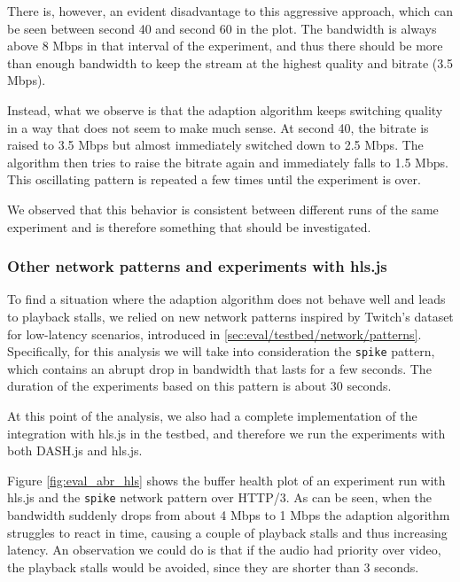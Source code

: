 There is, however, an evident disadvantage to this aggressive approach, which can be seen between second 40 and second 60 in the plot. The bandwidth is always above 8 Mbps in that interval of the experiment, and thus there should be more than enough bandwidth to keep the stream at the highest quality and bitrate (3.5 Mbps).

Instead, what we observe is that the adaption algorithm keeps switching quality in a way that does not seem to make much sense. At second 40, the bitrate is raised to 3.5 Mbps but almost immediately switched down to 2.5 Mbps. The algorithm then tries to raise the bitrate again and immediately falls to 1.5 Mbps. This oscillating pattern is repeated a few times until the experiment is over.

We observed that this behavior is consistent between different runs of the same experiment and is therefore something that should be investigated.


\subsubsection{Other network patterns and experiments with hls.js}
\label{sec:eval/abr/hls}

To find a situation where the adaption algorithm does not behave well and leads to playback stalls, we relied on new network patterns inspired by Twitch's dataset for low-latency scenarios, introduced in \ref{sec:eval/testbed/network/patterns}. Specifically, for this analysis we will take into consideration the \texttt{spike} pattern, which contains an abrupt drop in bandwidth that lasts for a few seconds. The duration of the experiments based on this pattern is about 30 seconds.

At this point of the analysis, we also had a complete implementation of the integration with hls.js in the testbed, and therefore we run the experiments with both DASH.js and hls.js.

Figure \ref{fig:eval_abr_hls} shows the buffer health plot of an experiment run with hls.js and the \texttt{spike} network pattern over HTTP/3. As can be seen, when the bandwidth suddenly drops from about 4 Mbps to 1 Mbps the adaption algorithm struggles to react in time, causing a couple of playback stalls and thus increasing latency. An observation we could do is that if the audio had priority over video, the playback stalls would be avoided, since they are shorter than 3 seconds.

